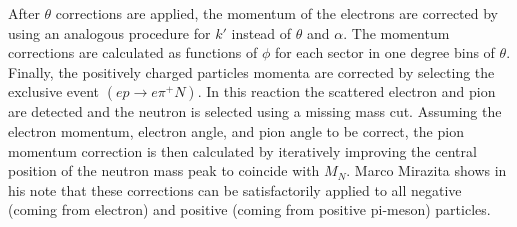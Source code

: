 After $\theta$ corrections are applied, the momentum of the electrons are corrected by using an analogous procedure for $k'$ instead of $\theta$ and $\alpha$.  The momentum corrections are calculated as functions of $\phi$ for each sector in one degree bins of $\theta$.  Finally, the positively charged particles momenta are corrected by selecting the exclusive event $(ep \rightarrow e\pi^+N)$.  In this reaction the scattered electron and pion are detected and the neutron is selected using a missing mass cut.  Assuming the electron momentum, electron angle, and pion angle to be correct, the pion momentum correction is then calculated by iteratively improving the central position of the neutron mass peak to coincide with $M_{N}$.  Marco Mirazita shows in his note that these corrections can be satisfactorily applied to all negative (coming from electron) and positive (coming from positive pi-meson) particles.    

